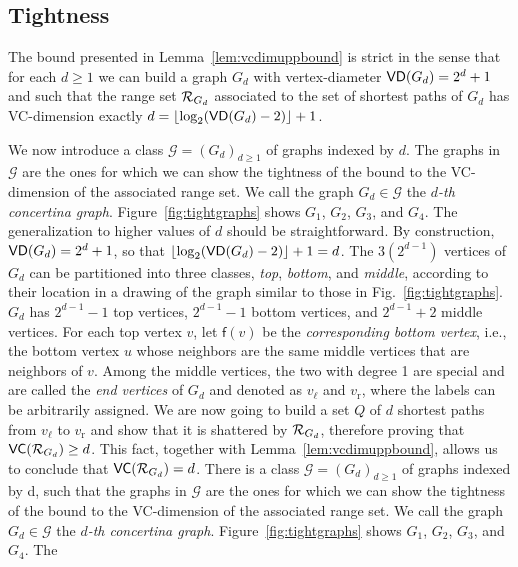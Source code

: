 \subsection{Tightness}\label{sec:tightness}
The bound presented in Lemma~\ref{lem:vcdimuppbound} is strict in the sense that
for each $d\ge 1$ we can build a graph $G_d$ with vertex-diameter
$\mathsf{VD}(G_d)=2^d+1$ and such that the range set $\mathcal{R}_{G_d}$ associated to the set of
shortest paths of $G_d$ has VC-dimension exactly
$d=\lfloor\log_2(\mathsf{VD}(G_d)-2)\rfloor+1$. 

\ifproof
We now introduce a class $\mathcal{G}=(G_d)_{d\ge 1}$ of graphs indexed by $d$.
The graphs in $\mathcal{G}$ are the ones for which we can show the tightness of
the bound to the VC-dimension of the associated range set.
We call the graph $G_d\in\mathcal{G}$ the \emph{$d$-th concertina graph}.
Figure~\ref{fig:tightgraphs} shows $G_1$, $G_2$, $G_3$, and $G_4$. The
generalization to higher values of $d$ should be straightforward.
By construction, $\mathsf{VD}(G_d)=2^d+1$, so that
$\lfloor\log_2(\mathsf{VD}(G_d)-2)\rfloor+1=d$. The $3(2^{d-1})$ vertices of $G_d$ can
be partitioned into three classes, \emph{top}, \emph{bottom}, and \emph{middle},
according to their location in a drawing of the graph similar to those in
Fig.~\ref{fig:tightgraphs}. $G_d$ has $2^{d-1}-1$ top vertices, $2^{d-1}-1$ bottom vertices, and
$2^{d-1}+2$ middle vertices. For each top vertex $v$, let $\mathsf{f}(v)$ be the
\emph{corresponding bottom vertex}, i.e., the bottom vertex $u$ whose neighbors
are the same middle vertices that are neighbors of $v$. Among the middle
vertices, the two with degree 1 are special and are called the \emph{end
vertices} of $G_d$ and denoted as $v_\ell$ and $v_\mathrm{r}$, where the
labels can be arbitrarily assigned. We are now going to build a set $Q$ of $d$
shortest paths from $v_\ell$ to $v_\mathrm{r}$ and show that it is
shattered by $\mathcal{R}_{G_d}$, therefore proving that $\mathsf{VC}(\mathcal{R}_{G_d})\ge d$.
This fact, together with Lemma~\ref{lem:vcdimuppbound}, allows us to conclude
that $\mathsf{VC}(\mathcal{R}_{G_d})=d$. 
\else
There is a class $\mathcal{G}=(G_d)_{d\ge 1}$ of graphs indexed by d, such that
the graphs in $\mathcal{G}$ are the ones for which we can show the tightness of
the bound to the VC-dimension of the associated range set. We call the graph
$G_d\in\mathcal{G}$ the \emph{$d$-th concertina graph}.
Figure~\ref{fig:tightgraphs} shows $G_1$, $G_2$, $G_3$, and $G_4$. The

